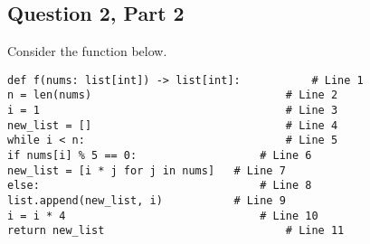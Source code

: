 \documentclass{article}
\begin{document}
\subsection*{Question 2, Part 2}

\noindent
Consider the function below.

\begin{verbatim}
def f(nums: list[int]) -> list[int]:           # Line 1
n = len(nums)                              # Line 2
i = 1                                      # Line 3
new_list = []                              # Line 4
while i < n:                               # Line 5
if nums[i] % 5 == 0:                   # Line 6
new_list = [i * j for j in nums]   # Line 7
else:                                  # Line 8
list.append(new_list, i)           # Line 9
i = i * 4                              # Line 10
return new_list                            # Line 11
\end{verbatim}
\end{document}
